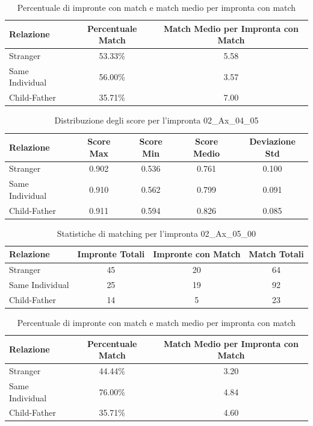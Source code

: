 \begin{table}[htbp]
\centering
\caption{Percentuale di impronte con match e match medio per impronta con match}
\label{tab:match_percentage_02_Ax_04_05}
\begin{tabular}{|l|c|c|}
\hline
\textbf{Relazione} & \textbf{Percentuale Match} & \textbf{Match Medio per Impronta con Match} \\
\hline
Stranger & 53.33\% & 5.58 \\
\hline
Same Individual & 56.00\% & 3.57 \\
\hline
Child-Father & 35.71\% & 7.00 \\
\hline
\end{tabular}
\end{table}


\begin{table}[htbp]
\centering
\caption{Distribuzione degli score per l'impronta 02\_Ax\_04\_05}
\label{tab:scores_02_Ax_04_05}
\begin{tabular}{|l|c|c|c|c|}
\hline
\textbf{Relazione} & \textbf{Score Max} & \textbf{Score Min} & \textbf{Score Medio} & \textbf{Deviazione Std} \\
\hline
Stranger & 0.902 & 0.536 & 0.761 & 0.100 \\
\hline
Same Individual & 0.910 & 0.562 & 0.799 & 0.091 \\
\hline
Child-Father & 0.911 & 0.594 & 0.826 & 0.085 \\
\hline
\end{tabular}
\end{table}


\begin{table}[htbp]
\centering
\caption{Statistiche di matching per l'impronta 02\_Ax\_05\_00}
\label{tab:results_02_Ax_05_00}
\begin{tabular}{|l|c|c|c|}
\hline
\textbf{Relazione} & \textbf{Impronte Totali} & \textbf{Impronte con Match} & \textbf{Match Totali} \\
\hline
Stranger & 45 & 20 & 64 \\
\hline
Same Individual & 25 & 19 & 92 \\
\hline
Child-Father & 14 & 5 & 23 \\
\hline
\end{tabular}
\end{table}


\begin{table}[htbp]
\centering
\caption{Percentuale di impronte con match e match medio per impronta con match}
\label{tab:match_percentage_02_Ax_05_00}
\begin{tabular}{|l|c|c|}
\hline
\textbf{Relazione} & \textbf{Percentuale Match} & \textbf{Match Medio per Impronta con Match} \\
\hline
Stranger & 44.44\% & 3.20 \\
\hline
Same Individual & 76.00\% & 4.84 \\
\hline
Child-Father & 35.71\% & 4.60 \\
\hline
\end{tabular}
\end{table}


